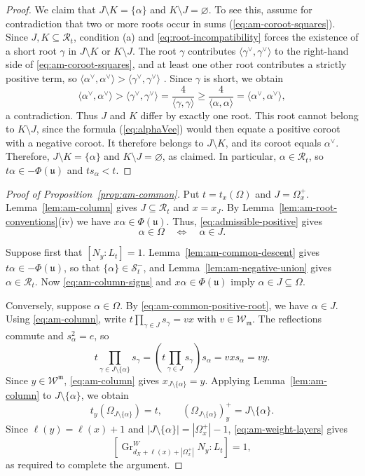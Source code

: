 \documentclass[12pt]{amsart}
\theoremstyle{definition}
\numberwithin{equation}{section}
\newcommand{\m}{\mathfrak m}
\newcommand{\W}{\mathscr W}
\begin{document}
\begin{proof}
We claim that $J\setminus K=\{\alpha\}$ and $K\setminus J=\varnothing$. To see this, assume for contradiction that two or more roots occur in sums (\ref{eq:am-coroot-squares}). Since $J,K\subseteq \mathscr{R}_t$, condition (a) and
\eqref{eq:root-incompatibility} forces the existence of a short root $\gamma$ in $J\setminus K$ or $K\setminus J$. The root $\gamma$ contributes
$\langle\gamma^\vee,\gamma^\vee\rangle$ to the right-hand
side of \eqref{eq:am-coroot-squares}, and at least one
other root contributes a strictly positive term, so $\langle\alpha^\vee,\alpha^\vee\rangle
 >\langle\gamma^\vee,\gamma^\vee\rangle$ .
Since $\gamma$ is short, we obtain
\[
 \langle\alpha^\vee,\alpha^\vee\rangle
 >\langle\gamma^\vee,\gamma^\vee\rangle
   =\frac{4}{\langle\gamma,\gamma\rangle}\geq \frac{4}{\langle\alpha,\alpha\rangle}=\langle\alpha^\vee,\alpha^\vee\rangle,
\]
a contradiction. Thus $J$ and $K$ differ by exactly one root. This root cannot belong to $K\setminus J$, since the formula
(\ref{eq:alphaVee}) would then equate a positive coroot with
a negative coroot. It therefore belongs to $J\setminus K$,
and its coroot equals $\alpha^\vee$. Therefore, $J\setminus K=\{\alpha\}$ and $K\setminus J=\varnothing$, as claimed. In particular, $\alpha\in\mathscr R_t$, so
$t\alpha\in-\Phi(\mathfrak{u})$ and $ts_\alpha<t$.
\end{proof}

\begin{proof}[Proof of Proposition~\ref{prop:am-common}]
Put $t=t_x(\Omega)$ and $J=\Omega_x^+$.
Lemma~\ref{lem:am-column} gives
$J\subseteq\mathscr R_t$ and $x=x_J$.
By Lemma~\ref{lem:am-root-conventions}\textup{(iv)} we have $x\alpha\in\Phi(\mathfrak{u})$. Thus,
\eqref{eq:admissible-positive} gives
\begin{equation}\label{eq:am-common-positive-root}
 \alpha\in\Omega\quad\Longleftrightarrow\quad\alpha\in J.
\end{equation}

Suppose first that $[N_y:L_t]=1$.
Lemma~\ref{lem:am-common-descent} gives
$t\alpha\in-\Phi(\mathfrak{u})$, so that $\{\alpha\}\in\mathscr S_t^-$,
and Lemma~\ref{lem:am-negative-union} gives
$\alpha\in\mathscr R_t$.
Now \eqref{eq:am-column-signs} and $x\alpha\in\Phi(\mathfrak{u})$
imply $\alpha\in J\subseteq\Omega$.

Conversely, suppose $\alpha\in\Omega$.
By \eqref{eq:am-common-positive-root}, we have $\alpha\in J$.
Using \eqref{eq:am-column}, write
$t\prod_{\gamma\in J}s_\gamma=vx$ with $v\in\W_{\m}$.
The reflections commute and $s_\alpha^2=e$, so
\[
 t\prod_{\gamma\in J\setminus\{\alpha\}}s_\gamma
 =\left(t\prod_{\gamma\in J}s_\gamma\right)s_\alpha
 =vxs_\alpha=vy.
\]
Since $y\in\W^{\m}$, \eqref{eq:am-column} gives
$x_{J\setminus\{\alpha\}}=y$.
Applying Lemma~\ref{lem:am-column} to $J\setminus\{\alpha\}$,
we obtain
\[
 t_y(\Omega_{J\setminus\{\alpha\}})=t,\qquad
 (\Omega_{J\setminus\{\alpha\}})^+_y=J\setminus\{\alpha\}.
\]
Since $\ell(y)=\ell(x)+1$ and
$|J\setminus\{\alpha\}|=|\Omega_x^+|-1$,
\eqref{eq:am-weight-layers} gives
\[
 [\operatorname{Gr}^{W}_{d_X+\ell(x)+|\Omega_x^+|}
   N_y:L_t]=1,
\]
as required to complete the argument.
\end{proof}
\end{document}
